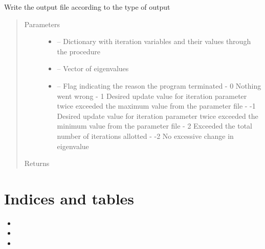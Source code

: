 \documentclass[letterpaper,10pt,english]{sphinxmanual}
\begin{document}
\begin{fulllineitems}
\label{\detokenize{outputs:critops.outputs.output_landing}}
Write the output file according to the type of output
\begin{quote}\begin{description}
\item[{Parameters}] \leavevmode\begin{itemize}
\item {} 
 -- Dictionary with iteration variables and their values through the procedure

\item {} 
 -- Vector of eigenvalues

\item {} 
 -- Flag indicating the reason the program terminated
- 0 Nothing went wrong
- 1 Desired update value for iteration parameter twice exceeded the maximum value from the parameter file
- -1 Desired update value for iteration parameter twice exceeded the minimum value from the parameter file
- 2 Exceeded the total number of iterations allotted
- -2 No excessive change in eigenvalue

\end{itemize}

\item[{Returns}] \leavevmode


\end{description}\end{quote}

\end{fulllineitems}



\chapter{Indices and tables}
\label{\detokenize{index:indices-and-tables}}\begin{itemize}
\item {} 

\item {} 

\item {} 

\end{itemize}
\end{document}
